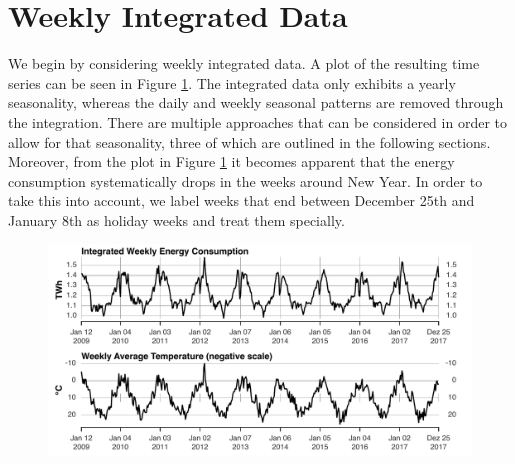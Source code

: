 \documentclass[conference]{IEEEtran}
\begin{document}
\par


\section{Weekly Integrated Data}
We begin by considering weekly integrated data. A plot of the resulting time series can be seen in Figure \ref{weekly}. The integrated data only exhibits a yearly seasonality, whereas the daily and weekly seasonal patterns are removed through the integration. There are multiple approaches that can be considered in order to allow for that seasonality, three of which are outlined in the following sections. Moreover, from the plot in Figure \ref{weekly} it becomes apparent that the energy consumption systematically drops in the weeks around New Year. In order to take this into account, we label weeks that end between December 25th and January 8th as holiday weeks and treat them specially. 

\begin{figure}[ht]
	\centering
	\includegraphics[width=1\textwidth]{Figs/weeklyInt+Temperature.pdf}
	\caption{}
	\label{weekly}
\end{figure}
\end{document}

